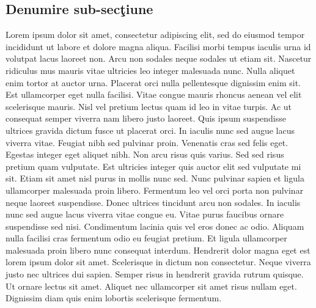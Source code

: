 \subsection{Denumire sub-sec\c{t}iune}
Lorem ipsum dolor sit amet, consectetur adipiscing elit, sed do eiusmod tempor incididunt ut labore et dolore magna aliqua. Facilisi morbi tempus iaculis urna id volutpat lacus laoreet non. Arcu non sodales neque sodales ut etiam sit. Nascetur ridiculus mus mauris vitae ultricies leo integer malesuada nunc. Nulla aliquet enim tortor at auctor urna. Placerat orci nulla pellentesque dignissim enim sit. Est ullamcorper eget nulla facilisi. Vitae congue mauris rhoncus aenean vel elit scelerisque mauris. Nisl vel pretium lectus quam id leo in vitae turpis. Ac ut consequat semper viverra nam libero justo laoreet. Quis ipsum suspendisse ultrices gravida dictum fusce ut placerat orci. In iaculis nunc sed augue lacus viverra vitae. Feugiat nibh sed pulvinar proin. Venenatis cras sed felis eget. Egestas integer eget aliquet nibh. Non arcu risus quis varius. Sed sed risus pretium quam vulputate.
Est ultricies integer quis auctor elit sed vulputate mi sit. Etiam sit amet nisl purus in mollis nunc sed. Nunc pulvinar sapien et ligula ullamcorper malesuada proin libero. Fermentum leo vel orci porta non pulvinar neque laoreet suspendisse. Donec ultrices tincidunt arcu non sodales. In iaculis nunc sed augue lacus viverra vitae congue eu. Vitae purus faucibus ornare suspendisse sed nisi. Condimentum lacinia quis vel eros donec ac odio. Aliquam nulla facilisi cras fermentum odio eu feugiat pretium. Et ligula ullamcorper malesuada proin libero nunc consequat interdum. Hendrerit dolor magna eget est lorem ipsum dolor sit amet. Scelerisque in dictum non consectetur. Neque viverra justo nec ultrices dui sapien. Semper risus in hendrerit gravida rutrum quisque. Ut ornare lectus sit amet. Aliquet nec ullamcorper sit amet risus nullam eget. Dignissim diam quis enim lobortis scelerisque fermentum.

